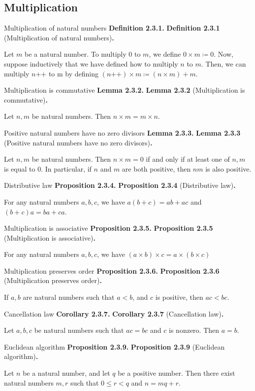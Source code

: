 \documentclass[12pt]{article}
\newcommand{\succr}[1]{#1 \textrm{++}}
\newenvironment{df}[2][\relax]{
\vspace{4mm}
    \noindent\setlength{\parskip}{1em}%
    \ifx#1\relax%
        \textbf{#2. }%
    \else%
        \textbf{#2} (#1)\textbf{. }%
    \fi%
    \ignorespaces%
}{}
\theoremstyle{remark}
\begin{document}
\subsection{Multiplication}

\begin{df}[Multiplication of natural numbers]{Definition 2.3.1}
    Let $m$ be a natural number.
    To multiply $0$ to $m$, we define $0 \times m \coloneqq 0$.
    Now, suppose inductively that we have defined how to multiply $n$ to $m$.
    Then, we can multiply $\succr{n}$ to m by defining $(\succr{n}) \times m \coloneqq (n \times m) + m$.%
\end{df}


\begin{df}[Multiplication is commutative]{Lemma 2.3.2}
    Let $n, m$ be natural numbers.
    Then $n \times m = m \times n$.    
\end{df}


\begin{df}[Positive natural numbers have no zero divisors]{Lemma 2.3.3}
    Let $n, m$ be natural numbers.
    Then $n \times m = 0$ if and only if at least one of $n, m$ is equal to $0$.
    In particular, if $n$ and $m$ are both positive, then $nm$ is also positive.
\end{df}


\begin{df}[Distributive law]{Proposition 2.3.4}
    For any natural numbers $a, b, c$, we have $a(b + c) = ab + ac$ and $(b + c)a = ba + ca$.
\end{df}


\begin{df}[Multiplication is associative]{Proposition 2.3.5}
    For any natural numbers $a, b, c$, we have $(a \times b)\times c = a \times (b \times c)$
\end{df}


\begin{df}[Multiplication preserves order]{Proposition 2.3.6}
    If $a, b$ are natural numbers such that $a < b$, and $c$ is positive, then $ac < bc$.
\end{df}


\begin{df}[Cancellation law]{Corollary 2.3.7}
    Let $a, b, c$ be natural numbers such that $ac = bc$ and $c$ is nonzero.
    Then $a = b$.
\end{df}


\begin{df}[Euclidean algorithm]{Proposition 2.3.9}
    Let $n$ be a natural number, and let $q$ be a positive number.
    Then there exist natural numbers $m, r$ such that $0 \le r < q$ and $n = mq + r$.
\end{df}
\end{document}
